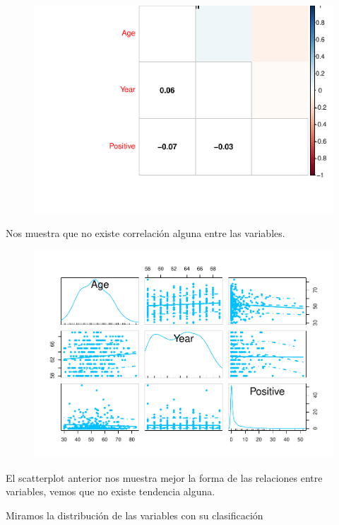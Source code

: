 \begin{figure}[H]\includegraphics[width=.9\linewidth]{img/EDA2_files/figure-latex/unnamed-chunk-27-2} \end{figure}

Nos muestra que no existe correlación alguna entre las variables.

\begin{figure}[H]\includegraphics[width=.9\linewidth]{img/EDA2_files/figure-latex/unnamed-chunk-28-1} \end{figure}

El scatterplot anterior nos muestra mejor la forma de las relaciones entre variables, vemos que no existe tendencia alguna.

Miramos la distribución de las variables con su clasificación

